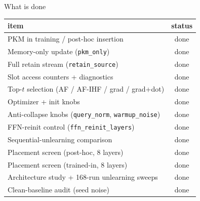 \documentclass{beamer}
\newcommand{\stdone}{\textcolor{green!50!black}{done}}
\begin{document}
\begin{frame}{What is done}
\begin{center}
\begin{tabular}{|l|c|}
\hline
item & status \\
\hline
PKM in training / post-hoc insertion            & \stdone \\
Memory-only update (\texttt{pkm\_only})          & \stdone \\
Full retain stream (\texttt{retain\_source})     & \stdone \\
Slot access counters + diagnostics               & \stdone \\
Top-$t$ selection (AF / AF-IHF / grad / grad+dot)& \stdone \\
Optimizer + init knobs                           & \stdone \\
Anti-collapse knobs (\texttt{query\_norm}, \texttt{warmup\_noise}) & \stdone \\
FFN-reinit control (\texttt{ffn\_reinit\_layers})  & \stdone \\
Sequential-unlearning comparison                  & \stdone \\
Placement screen (post-hoc, 8 layers)            & \stdone \\
Placement screen (trained-in, 8 layers)          & \stdone \\
Architecture study + 168-run unlearning sweeps   & \stdone \\
Clean-baseline audit (seed noise)                & \stdone \\
\hline
\end{tabular}
\end{center}
\end{frame}
\end{document}

